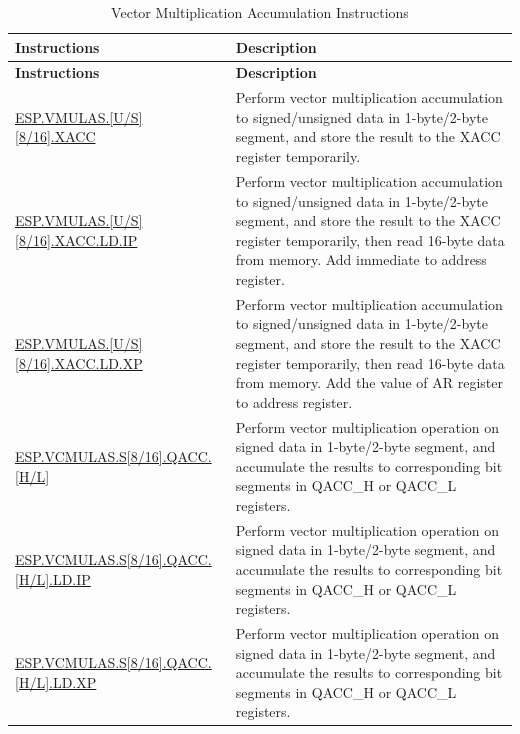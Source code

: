 \begin{longtable}[c]{|l|m{9cm}|}
    \caption{Vector Multiplication Accumulation Instructions}
    \label{tab:pie-mula-instructions}\\
    \hline
    \rowcolor{lightgray}
    \textbf{Instructions} & \textbf{Description} \\\hline
    \endfirsthead
    \rowcolor{lightgray}
    \textbf{Instructions} & \textbf{Description} \\\hline
    \endhead
    \endfoot

    \hyperref[instruction:ESPVMULASU8XACC]{ESP.VMULAS.[U/S][8/16].XACC} & Perform vector multiplication accumulation to signed/unsigned data in 1-byte/2-byte segment, and store the result to the XACC register temporarily.
    \\\hline
    \hyperref[instruction:ESPVMULASU8XACCLDIP]{ESP.VMULAS.[U/S][8/16].XACC.LD.IP} & Perform vector multiplication accumulation to signed/unsigned data in 1-byte/2-byte segment, and store the result to the XACC register temporarily, then read 16-byte data from memory. Add immediate to address register.
    \\\hline
    \hyperref[instruction:ESPVMULASU8XACCLDXP]{ESP.VMULAS.[U/S][8/16].XACC.LD.XP} & Perform vector multiplication accumulation to signed/unsigned data in 1-byte/2-byte segment, and store the result to the XACC register temporarily, then read 16-byte data from memory. Add the value of AR register to address register.
    \\\hline
    \hyperref[instruction:ESPVCMULASS8QACC_H]{ESP.VCMULAS.S[8/16].QACC.[H/L]} & Perform vector multiplication operation on signed data in 1-byte/2-byte segment, and accumulate the results to corresponding bit segments in QACC\_H or QACC\_L registers.
    \\\hline
\hyperref[instruction:ESPVCMULASS8QACC_HLDIP]{ESP.VCMULAS.S[8/16].QACC.[H/L].LD.IP} & Perform vector multiplication operation on signed data in 1-byte/2-byte segment, and accumulate the results to corresponding bit segments in QACC\_H or QACC\_L registers.
    \\\hline
    \hyperref[instruction:ESPVCMULASS8QACC_HLDXP]{ESP.VCMULAS.S[8/16].QACC.[H/L].LD.XP} & Perform vector multiplication operation on signed data in 1-byte/2-byte segment, and accumulate the results to corresponding bit segments in QACC\_H or QACC\_L registers.
    \\\hline


\end{longtable}
